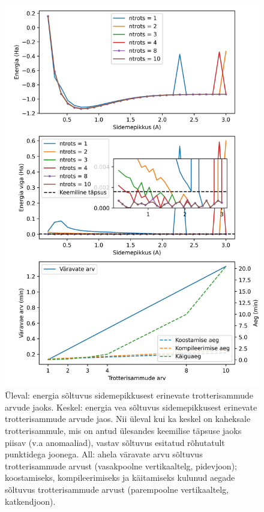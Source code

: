 \documentclass[12pt]{report}
\begin{document}
\begin{figure}
  \centering
  \includegraphics[height=.75\vsize]{h2plots.jpg}
  \caption{Üleval: energia sõltuvus sidemepikkusest erinevate trotterisammude arvude jaoks.
    Keskel: energia vea sõltuvus sidemepikkusest erinevate trotterisammude arvude jaos.
    Nii üleval kui ka keskel on kaheksale trotterisammule, mis on antud ülesandes keemilise täpsuse jaoks piisav (v.a anomaaliad), vastav sõltuvus esitatud rõhutatult punktidega joonega.
    All: ahela väravate arvu sõltuvus trotterisammude arvust (vasakpoolne vertikaaltelg, pidevjoon); koostamiseks, kompileerimiseks ja käitamiseks kulunud aegade sõltuvus trotterisammude arvust (parempoolne vertikaaltelg, katkendjoon).}
  \label{fig:h2plots}
\end{figure}
\end{document}
